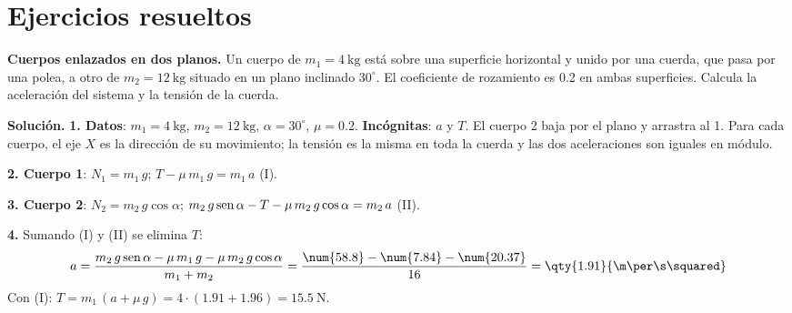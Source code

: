 
\section{Ejercicios resueltos}\label{sec:ud11-resueltos}

\begin{example}
    \textbf{Cuerpos enlazados en dos planos.} Un cuerpo de \(m_1 = \qty{4}{\kg}\) está sobre una superficie horizontal y unido por una
    cuerda, que pasa por una polea, a otro de \(m_2 = \qty{12}{\kg}\) situado en un plano inclinado \(30^\circ\). El coeficiente de
    rozamiento es \num{0.2} en ambas superficies. Calcula la aceleración del sistema y la tensión de la cuerda.

    \textbf{Solución.} \textbf{1. Datos}: \(m_1 = \qty{4}{\kg}\), \(m_2 = \qty{12}{\kg}\), \(\alpha = 30^\circ\), \(\mu = \num{0.2}\).
    \textbf{Incógnitas}: \(a\) y \(T\). El cuerpo 2 baja por el plano y arrastra al 1. Para cada cuerpo, el eje \(X\) es la dirección de su
    movimiento; la tensión es la misma en toda la cuerda y las dos aceleraciones son iguales en módulo.

    \textbf{2. Cuerpo 1}: \(N_1 = m_1\,g\); \(T - \mu\,m_1\,g = m_1\,a\) (I).

    \textbf{3. Cuerpo 2}: \(N_2 = m_2\,g\cos\alpha\); \(m_2\,g\operatorname{sen}\alpha - T - \mu\,m_2\,g\cos\alpha = m_2\,a\) (II).

    \textbf{4.} Sumando (I) y (II) se elimina \(T\):
    \[ a = \frac{m_2\,g\sen\alpha - \mu\,m_1\,g - \mu\,m_2\,g\cos\alpha}{m_1 + m_2} = \frac{\num{58.8} - \num{7.84} - \num{20.37}}{16}
    = \qty{1.91}{\m\per\s\squared} \]
    Con (I): \(T = m_1\,(a + \mu\,g) = 4 \cdot (\num{1.91} + \num{1.96}) = \qty{15.5}{\newton}\).
\end{example}


